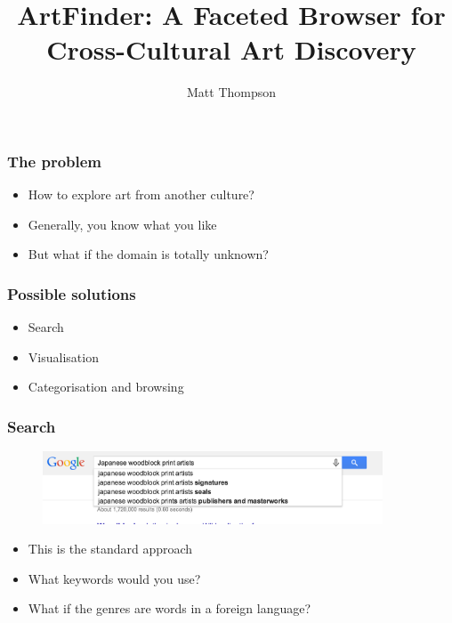 \documentclass{beamer}
\title{ArtFinder: A Faceted Browser for Cross-Cultural Art Discovery}
\author{Matt Thompson}
\institute{University of Bath, NII Tokyo, Sysemia Ltd Bristol}
\date{}
\begin{document}
\frame{\titlepage}

\begin{frame}
    \frametitle{The problem}
        \begin{itemize}
            \item How to explore art from another culture?
            \item Generally, you know what you like
            \item But what if the domain is totally unknown?
        \end{itemize}
\end{frame}



\begin{frame}
    \frametitle{Possible solutions}
        \begin{itemize}
            \item Search
            \item Visualisation
            \item Categorisation and browsing
        \end{itemize}
\end{frame}

\begin{frame}
    \frametitle{Search}
    \begin{figure}
        \centering
        \includegraphics[width=0.9\textwidth]{search.png}
    \end{figure}
        \begin{itemize}
            \item This is the standard approach
            \item What keywords would you use?
            \item What if the genres are words in a foreign language?
        \end{itemize}
\end{frame}
\end{document}
